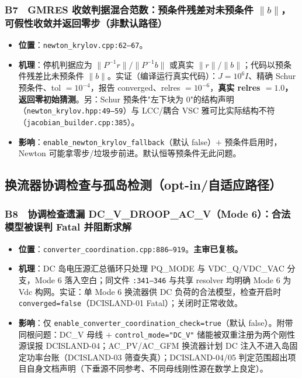 \documentclass[11pt,a4paper,fontset=fandol]{ctexart}
\newcommand{\file}[1]{\texttt{#1}}
\begin{document}
\subsubsection*{B7　GMRES 收敛判据混合范数：预条件残差对未预条件 $\lVert b\rVert$，可假性收敛并返回零步（非默认路径）}
\begin{itemize}
  \item \textbf{位置}：\file{newton\_krylov.cpp:62--67}。
  \item \textbf{机理}：停机判据应为 $\lVert P^{-1}r\rVert/\lVert P^{-1}b\rVert$ 或真实 $\lVert r\rVert/\lVert b\rVert$；代码以预条件残差比未预条件 $\lVert b\rVert$。实证（编译运行真实代码）：$J=10^6 I$、精确 Schur 预条件、tol $=10^{-4}$，报告 converged、relres $=10^{-6}$，\textbf{真实 relres $=1.0$，返回零初始猜测}。另：Schur 预条件"左下块为 0"的结构声明（\file{newton\_krylov.hpp:49--59}）与 LCC/耦合 VSC 雅可比实际结构不符（\file{jacobian\_builder.cpp:385}）。
  \item \textbf{影响}：\texttt{enable\_newton\_krylov\_fallback}（默认 false）$+$ 预条件启用时，Newton 可能拿零步/垃圾步前进。默认恒等预条件无此问题。
\end{itemize}

\subsection{换流器协调检查与孤岛检测（opt-in/自适应路径）}

\subsubsection*{B8　协调检查遗漏 DC\_V\_DROOP\_AC\_V（Mode 6）：合法模型被误判 Fatal 并阻断求解}
\begin{itemize}
  \item \textbf{位置}：\file{converter\_coordination.cpp:886--919}。\textbf{主审已复核。}
  \item \textbf{机理}：DC 岛电压源汇总循环只处理 PQ\_MODE 与 VDC\_Q/VDC\_VAC 分支，Mode 6 落入空白；同文件 \file{:341--346} 与共享 resolver 均明确 Mode 6 为 Vdc 构网。实证：单 Mode 6 换流器供 DC 负荷的合法模型，检查开启时 \texttt{converged=false}（DCISLAND-01 Fatal）；关闭时正常收敛。
  \item \textbf{影响}：仅 \texttt{enable\_converter\_coordination\_check=true}（默认 false）。附带同根问题：DC\_V 母线 $+$ \texttt{control\_mode="DC\_V"} 储能被双重注册为两个刚性源误报 DCISLAND-04；AC\_PV/AC\_GFM 换流器计划 DC 注入不进入岛固定功率台账（DCISLAND-03 筛查失真）；DCISLAND-04/05 判定范围超出项目自身文档声明（下垂源不同参考、不同母线刚性源在数学上良定）。
\end{itemize}
\end{document}
